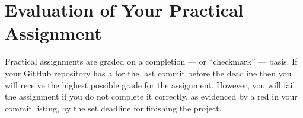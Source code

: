 \documentclass[11pt]{article}
\newcommand{\checkmark}{\ding{51}}
\newcommand{\naughtmark}{\ding{55}}
\begin{document}
\vspace*{-1em}

\section*{Evaluation of Your Practical Assignment}

Practical assignments are graded on a completion --- or ``checkmark'' --- basis.
If your GitHub repository has a \checkmark{} for the last commit before the
deadline then you will receive the highest possible grade for the assignment.
However, you will fail the assignment if you do not complete it correctly, as
evidenced by a red \naughtmark{} in your commit listing, by the set deadline for
finishing the project.

\end{document}
